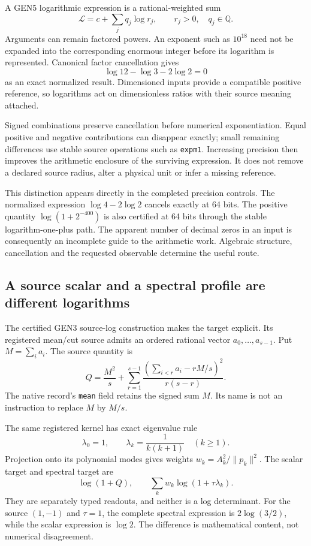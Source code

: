 A GEN5 logarithmic expression is a rational-weighted sum
\[
 \mathcal L=c+\sum_jq_j\log r_j,
 \qquad r_j>0,\quad q_j\in\mathbb Q.
\]
Arguments can remain factored powers. An exponent such as $10^{18}$ need not be expanded into the corresponding enormous integer before its logarithm is represented. Canonical factor cancellation gives
\[
 \log12-\log3-2\log2=0
\]
as an exact normalized result. Dimensioned inputs provide a compatible positive reference, so logarithms act on dimensionless ratios with their source meaning attached.

Signed combinations preserve cancellation before numerical exponentiation. Equal positive and negative contributions can disappear exactly; small remaining differences use stable source operations such as \texttt{expm1}. Increasing precision then improves the arithmetic enclosure of the surviving expression. It does not remove a declared source radius, alter a physical unit or infer a missing reference.

This distinction appears directly in the completed precision controls. The normalized expression $\log4-2\log2$ cancels exactly at 64 bits. The positive quantity $\log(1+2^{-400})$ is also certified at 64 bits through the stable logarithm-one-plus path. The apparent number of decimal zeros in an input is consequently an incomplete guide to the arithmetic work. Algebraic structure, cancellation and the requested observable determine the useful route.

\subsection{A source scalar and a spectral profile are different logarithms}
\label{v3-runtime-source-log}

The certified GEN3 source-log construction makes the target explicit. Its registered mean/cut source admits an ordered rational vector $a_0,\ldots,a_{s-1}$. Put $M=\sum_i a_i$. The source quantity is
\[
 Q=\frac{M^2}{s}
 +\sum_{r=1}^{s-1}
 \frac{\left(\sum_{i<r}a_i-rM/s\right)^2}{r(s-r)}.
\]
The native record's \texttt{mean} field retains the signed sum $M$. Its name is not an instruction to replace $M$ by $M/s$.

The same registered kernel has exact eigenvalue rule
\[
 \lambda_0=1,\qquad
 \lambda_k=\frac1{k(k+1)}\quad(k\geq1).
\]
Projection onto its polynomial modes gives weights
$w_k=A_k^2/\|p_k\|^2$. The scalar target and spectral target are
\[
 \log(1+Q),\qquad
 \sum_kw_k\log(1+\tau\lambda_k).
\]
They are separately typed readouts, and neither is a log determinant. For the source $(1,-1)$ and $\tau=1$, the complete spectral expression is $2\log(3/2)$, while the scalar expression is $\log2$. The difference is mathematical content, not numerical disagreement.

